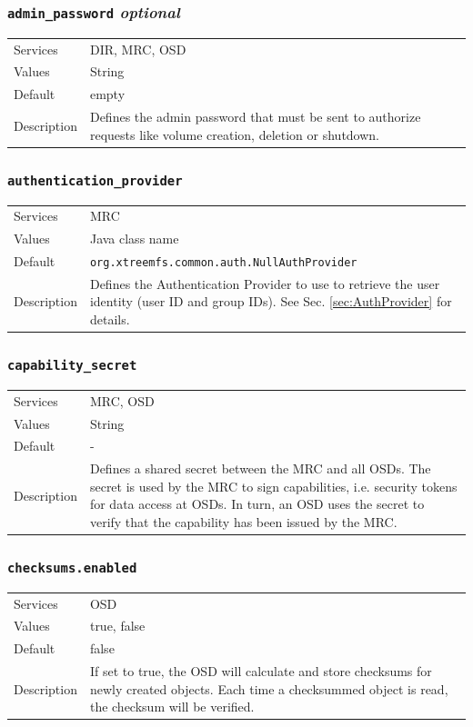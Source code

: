 \documentclass[a4paper,10pt]{book}
\begin{document}
\subsubsection{\texttt{admin\_password} \textit{optional}}
\begin{tabular}{lp{10cm}}
 Services & DIR, MRC, OSD\\
 Values   & String \\
 Default  & empty\\
 Description & Defines the admin password that must be sent to authorize requests like volume creation, deletion or shutdown.
\end{tabular}

\subsubsection{\texttt{authentication\_provider}}
\begin{tabular}{lp{10cm}}
 Services & MRC\\
 Values   & Java class name \\
 Default  & \texttt{org.xtreemfs.common.auth.NullAuthProvider}\\
 Description & Defines the Authentication Provider to use to retrieve the user identity (user ID and group IDs). See Sec. \ref{sec:AuthProvider} for details.
\end{tabular}

\subsubsection{\texttt{capability\_secret}}
\begin{tabular}{lp{10cm}}
 Services & MRC, OSD\\
 Values   & String \\
 Default  & - \\
 Description & Defines a shared secret between the MRC and all OSDs. The secret is used by the MRC to sign capabilities, i.e. security tokens for data access at OSDs. In turn, an OSD uses the secret to verify that the capability has been issued by the MRC.
\end{tabular}

\subsubsection{\texttt{checksums.enabled}}
\begin{tabular}{lp{10cm}}
 Services & OSD\\
 Values   & true, false \\
 Default  & false \\
 Description & If set to true, the OSD will calculate and store checksums for newly created objects. Each time a checksummed object is read, the checksum will be verified.
\end{tabular}
\end{document}
